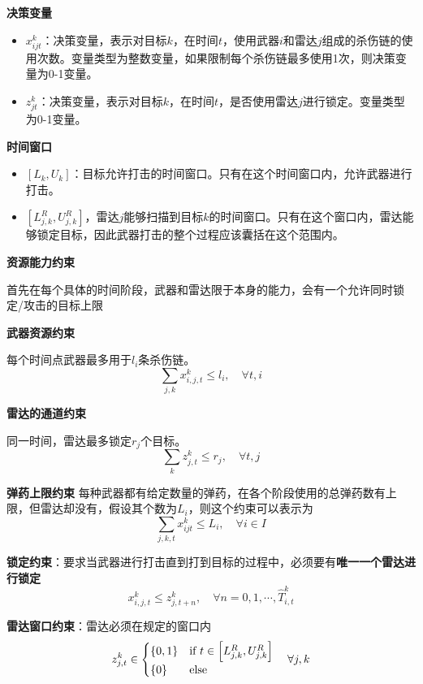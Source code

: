 \textbf{决策变量}
\begin{itemize}
    \item  $x_{ijt}^k$：决策变量，表示对目标$k$，在时间$t$，使用武器$i$和雷达$j$组成的杀伤链的使用次数。变量类型为整数变量，如果限制每个杀伤链最多使用1次，则决策变量为0-1变量。
    \item $z_{jt}^k$：决策变量，表示对目标$k$，在时间$t$，是否使用雷达$j$进行锁定。变量类型为0-1变量。
\end{itemize}

\textbf{时间窗口}
\begin{itemize}
    \item $[L_{k}, U_k]$：目标允许打击的时间窗口。只有在这个时间窗口内，允许武器进行打击。
    \item $[L_{j, k}^R, U_{j,k}^R]$，雷达$j$能够扫描到目标$k$的时间窗口。只有在这个窗口内，雷达能够锁定目标，因此武器打击的整个过程应该囊括在这个范围内。
\end{itemize}


\textbf{资源能力约束}

首先在每个具体的时间阶段，武器和雷达限于本身的能力，会有一个允许同时锁定/攻击的目标上限

\textbf{武器资源约束}

每个时间点武器最多用于$l_i$条杀伤链。
\begin{equation*}
    \sum_{j, k} x_{i,j,t}^k \leq l_i, \quad \forall t, i 
\end{equation*}

\textbf{雷达的通道约束}

同一时间，雷达最多锁定$r_j$个目标。
\begin{equation*}
    \sum_{k} z_{j,t}^k \leq r_j, \quad \forall t,j
\end{equation*}

\textbf{弹药上限约束}
每种武器都有给定数量的弹药，在各个阶段使用的总弹药数有上限，但雷达却没有，假设其个数为$L_i$，则这个约束可以表示为
\begin{equation*}
    \sum_{j,k,t} x_{ijt}^k \leq L_i, \quad \forall i \in I
\end{equation*}


\textbf{锁定约束}：要求当武器进行打击直到打到目标的过程中，必须要有\textbf{唯一一个雷达进行锁定}
\begin{equation*}
    x_{i,j,t}^k \leq z_{j, t+n}^k, \quad \forall n = 0, 1, \cdots, \hat{T}_{i,t}^k 
\end{equation*}

\textbf{雷达窗口约束}：雷达必须在规定的窗口内
\begin{equation*}
    z_{j, t}^k \in \begin{cases} 
        \{0,1\} & \text{if } t \in \left[ L_{j,k}^R, U_{j,k}^R \right]  \\
        \{0\} & \text{else}  
        \end{cases}\quad \forall j, k
\end{equation*}

